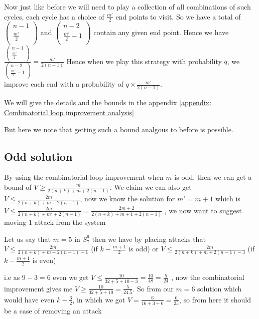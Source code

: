 \documentclass[a4paper,10pt]{article}
\theoremstyle{definition}
\theoremstyle{definition}
\theoremstyle{remark}
\theoremstyle{definition}
\begin{document}
Now just like before we will need to play a collection of all combinations of such cycles, each cycle has a choice of $\frac{m'}{2}$ end points to visit. So we have a total of $\left( \begin{array}{c}
n-1 \\
\frac{m'}{2} \\
\end{array} \right)
$
and  $\left( \begin{array}{c}
n-2 \\
\frac{m'}{2}-1 \\
\end{array} \right)
$
contain any given end point. Hence we have $\frac{\left( \begin{array}{c}
n-1 \\
\frac{m'}{2} \\
\end{array} \right)}{\left( \begin{array}{c}
n-2 \\
\frac{m'}{2}-1 \\
\end{array} \right)}=
\frac{m'}{2(n-1)}
$
Hence when we play this strategy with probability $q$, we improve each end with a probability of $q \times \frac{m'}{2(n-1)}$.

We will give the details and the bounds in the appendix \ref{appendix: Combinatorial loop improvement analysis}

But here we note that getting such a bound analgous to before is possible.

\subsection{Odd solution}
By using the combinatorial loop improvement when $m$ is odd, then we can get a bound of $V \geq \frac{m}{2(n+k)+m+2(n-1)}$. We claim we can also get $V \leq \frac{2m}{2(n+k)+m+2(n-1)}$, now we know the solution for $m'=m+1$ which is $V \leq \frac{2m'}{2(n+k)+m'+2(n-1)}=\frac{2m+2}{2(n+k)+m+1+2(n-1)}$ , we now want to suggest moving $1$ attack from the system

Let us say that $m=5$ in $S_{7}^{9}$ then we have by placing attacks that $V \leq \frac{2m}{2(n+k)+m+2(n-1)-1}$ (if $k-\frac{m+1}{2}$ is odd) or $V \leq \frac{2m}{2(n+k)+m+2(n-1)-3}$ (if $k-\frac{m+1}{2}$ is even) 

i.e as $9-3=6$ even we get $V \leq \frac{10}{32+5+10-3}=\frac{10}{48}=\frac{5}{24}$ , now the combinatorial improvement gives me $V \geq \frac{10}{32+5+10}=\frac{5}{24.5}$. So from our $m=6$ solution which would have even $k-\frac{6}{2}$, in which we got $V=\frac{6}{16+3+6}=\frac{6}{25}$, so from here it should be a case of removing an attack
\end{document}
